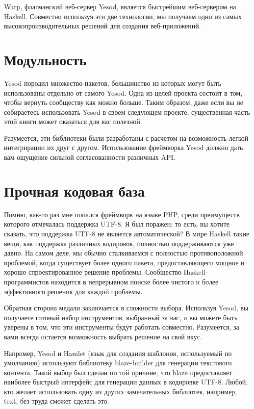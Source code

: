 Warp, флагманский веб-сервер Yesod, является быстрейшим веб-сервером на Haskell. Совместно используя эти две технологии, мы получаем одно из самых высокопроизводительных решений для создания веб-приложений.

\section{Модульность}

Yesod породил множество пакетов, большинство из которых могут быть использованы отдельно от самого Yesod. Одна из целей проекта состоит в том, чтобы вернуть сообществу как можно больше. Таким образом, даже если вы не собираетесь использовать Yesod в своем следующем проекте, существенная часть этой книги может оказаться для вас полезной.

Разумеется, эти библиотеки были разработаны с расчетом на возможность легкой интегрирации их друг с другом. Использование фреймворка Yesod должно дать вам ощущение сильной согласованности различных API.

\section{Прочная кодовая база}

Помню, как-то раз мне попался фреймворк на языке PHP, среди преимуществ которого отмечалась поддержка UTF-8. Я был поражен: то есть, вы хотите сказать, что поддержка UTF-8 не является автоматической? В мире Haskell такие вещи, как поддержка различных кодировок, полностью поддерживаются уже давно. На самом деле, мы обычно сталкиваемся с полностью противоположной проблемой, когда существует более одного пакета, предоставляющего мощное и хорошо спроектированное решение проблемы. Сообщество Haskell-программистов находится в непрерывном поиске более чистого и более эффективного решения для каждой проблемы.

Обратная сторона медали заключается в сложности выбора. Используя Yesod, вы получаете готовый набор инструментов, выбранный за вас, и вы можете быть уверены в том, что эти инструменты будут работать совместно. Разумеется, за вами всегда остается возможность выбрать решение на свой вкус.

Например, Yesod и Hamlet (язык для создания шаблонов, используемый по умолчанию) используют библиотеку blaze-builder для генерации текстового контента. Такой выбор был сделан по той причине, что blaze предоставляет наиболее быстрый интерфейс для генерации данных в кодировке UTF-8. Любой, кто желает использовать одну из других замечательных библиотек, например, text, без труда сможет сделать это.


